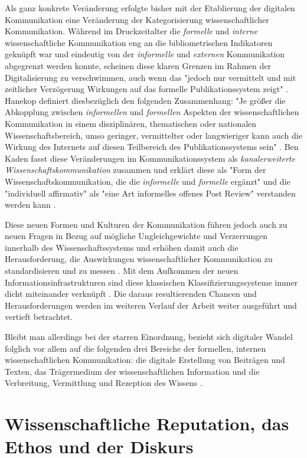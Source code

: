 Als ganz konkrete Veränderung erfolgte bisher mit der Etablierung der digitalen Kommunikation eine Veränderung der Kategorisierung wissenschaftlicher Kommunikation. Während im Druckzeitalter die \textit{formelle} und \textit{interne} wissenschaftliche Kommunikation eng an die bibliometrischen Indikatoren geknüpft war und eindeutig von der \textit{informelle} und \textit{externen} Kommunikation abgegrenzt werden konnte, scheinen diese klaren Grenzen im Rahmen der Digitalisierung zu verschwimmen, auch wenn das "jedoch nur vermittelt und mit zeitlicher Verzögerung Wirkungen auf das formelle Publikationssystem zeigt" \cite{Hanekop_2014}. Hanekop definiert diesbezüglich den folgenden Zusammenhang: "Je größer die Abkopplung zwischen \textit{informellen} und \textit{formellen} Aspekten der wissenschaftlichen Kommunikation in einem disziplinären, thematischen oder nationalen Wissenschaftsbereich, umso geringer, vermittelter oder langwieriger kann auch die Wirkung des Internets auf diesen Teilbereich des Publikationssystems sein" \cite{Hanekop_2014}. Ben Kaden fasst diese Veränderungen im Kommunikationssystem als \textit{kanalerweiterte Wissenschaftskommunikation} zusammen und erklärt diese als "Form der Wissenschaftskommunikation, die die \textit{informelle} und \textit{formelle} ergänzt" und die "individuell affirmativ" als "eine Art informelles offenes Post Review" verstanden werden kann \cite{kaden_2009_library}.

Diese neuen Formen und Kulturen der Kommunikation führen jedoch auch zu neuen Fragen in Bezug auf mögliche Ungleichgewichte und Verzerrungen innerhalb des Wissenschaftssystems und erhöhen damit auch die Herausforderung, die Auswirkungen wissenschaftlicher Kommunikation zu standardisieren und zu messen \cite{gerber_2014_science}. Mit dem Aufkommen der neuen Informationsinfrastrukturen sind diese klassischen Klassifizierungssysteme immer dicht miteinander verknüpft \cite[:326]{bowker_2000_sorting}. Die daraus resultierenden Chancen und Herausforderungen werden im weiteren Verlauf der Arbeit weiter ausgeführt und vertieft betrachtet.

Bleibt man allerdings bei der starren Einordnung, bezieht sich digitaler Wandel folglich vor allem auf die folgenden drei Bereiche der formellen, internen wissenschaftlichen Kommunikation: die digitale Erstellung von Beiträgen und Texten, das Trägermedium der wissenschaftlichen Information und die Verbreitung, Vermittlung und Rezeption des Wissens \cite{bbaw_publizieren_2015}.

\section{Wissenschaftliche Reputation, das Ethos und der Diskurs}

